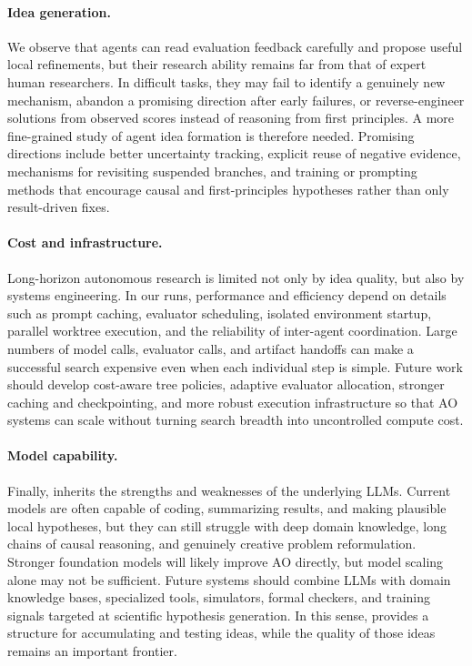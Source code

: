 \paragraph{Idea generation.}
We observe that agents can read evaluation feedback carefully and propose useful
local refinements, but their research ability remains far from that of expert
human researchers. In difficult tasks, they may fail to identify a genuinely new
mechanism, abandon a promising direction after early failures, or reverse-engineer
solutions from observed scores instead of reasoning from first principles. A more
fine-grained study of agent idea formation is therefore needed. Promising
directions include better uncertainty tracking, explicit reuse of negative
evidence, mechanisms for revisiting suspended branches, and training or prompting
methods that encourage causal and first-principles hypotheses rather than only
result-driven fixes.

\paragraph{Cost and infrastructure.}
Long-horizon autonomous research is limited not only by idea quality, but also
by systems engineering. In our runs, performance and efficiency depend on details
such as prompt caching, evaluator scheduling, isolated environment startup,
parallel worktree execution, and the reliability of inter-agent coordination.
Large numbers of model calls, evaluator calls, and artifact handoffs can make a
successful search expensive even when each individual step is simple. Future work
should develop cost-aware tree policies, adaptive evaluator allocation, stronger
caching and checkpointing, and more robust execution infrastructure so that AO
systems can scale without turning search breadth into uncontrolled compute cost.

\paragraph{Model capability.}
Finally, \arbor{} inherits the strengths and weaknesses of the underlying LLMs.
Current models are often capable of coding, summarizing results, and making
plausible local hypotheses, but they can still struggle with deep domain
knowledge, long chains of causal reasoning, and genuinely creative problem
reformulation. Stronger foundation models will likely improve AO directly, but
model scaling alone may not be sufficient. Future systems should combine LLMs
with domain knowledge bases, specialized tools, simulators, formal checkers, and
training signals targeted at scientific hypothesis generation. In this sense,
\arbor{} provides a structure for accumulating and testing ideas, while the
quality of those ideas remains an important frontier.

